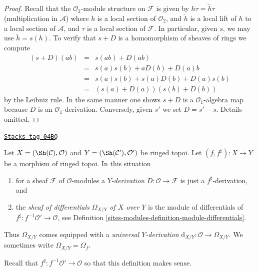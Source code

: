 \begin{proof}
Recall that the $\mathcal{O}_2$-module structure on $\mathcal{F}$
is given by $h \tau = \tilde h \tau$ (multiplication in $\mathcal{A}$)
where $h$ is a local section of $\mathcal{O}_2$, and
$\tilde h$ is a local lift of $h$ to a local
section of $\mathcal{A}$, and $\tau$ is a local section of $\mathcal{F}$.
In particular, given $s$, we may use $\tilde h = s(h)$.
To verify that $s + D$ is a homomorphism of sheaves of rings we
compute
\begin{eqnarray*}
(s + D)(ab) & = & s(ab) + D(ab) \\
& = & s(a)s(b) + aD(b) + D(a)b \\
& = & s(a) s(b) + s(a)D(b) + D(a)s(b) \\
& = & (s(a) + D(a))(s(b) + D(b))
\end{eqnarray*}
by the Leibniz rule. In the same manner one shows
$s + D$ is a $\mathcal{O}_1$-algebra map because $D$ is
an $\mathcal{O}_1$-derivation. Conversely, given $s'$ we set
$D = s' - s$. Details omitted.
\end{proof}

\begin{definition}
\label{sites-modules-definition-sheaf-differentials}
\href{https://stacks.math.columbia.edu/tag/04BQ}{\texttt{Stacks tag 04BQ}}

Let $X = (\Sh(\mathcal{C}), \mathcal{O})$ and
$Y = (\Sh(\mathcal{C}'), \mathcal{O}')$ be ringed topoi.
Let $(f, f^\sharp) : X \to Y$ be a morphism of ringed topoi.
In this situation
\begin{enumerate}
\item for a sheaf $\mathcal{F}$ of $\mathcal{O}$-modules a
{\it $Y$-derivation} $D : \mathcal{O} \to \mathcal{F}$ is just a
$f^\sharp$-derivation, and
\item the {\it sheaf of differentials $\Omega_{X/Y}$ of $X$ over $Y$}
is the module of differentials of
$f^\sharp : f^{-1}\mathcal{O}' \to \mathcal{O}$,
see Definition \ref{sites-modules-definition-module-differentials}.
\end{enumerate}
Thus $\Omega_{X/Y}$ comes equipped with a {\it universal $Y$-derivation}
$\text{d}_{X/Y} : \mathcal{O} \longrightarrow \Omega_{X/Y}$. We sometimes
write $\Omega_{X/Y} = \Omega_f$.
\end{definition}

Recall that $f^\sharp : f^{-1}\mathcal{O}' \to \mathcal{O}$ so that
this definition makes sense.

